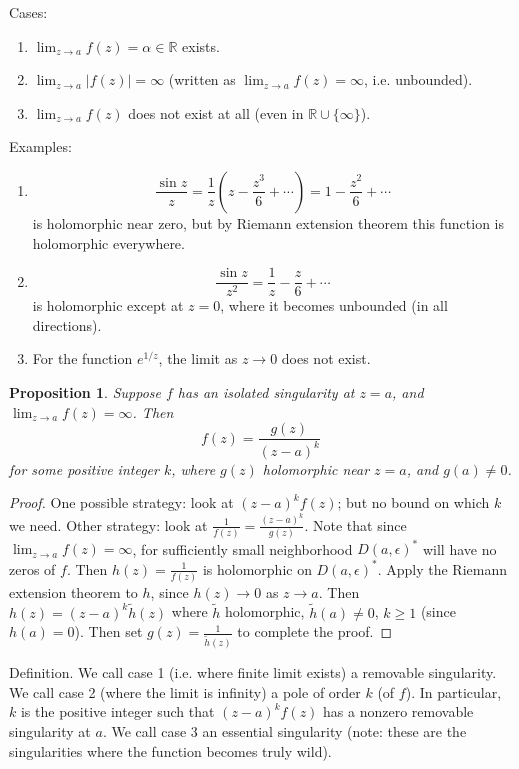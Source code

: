 \documentclass{artikel3}
\newcommand{\pr}[1]{\left(#1\right)}
\newcommand{\abs}[1]{\left|#1\right|}
\newcommand{\alt}[1]{\tilde{#1}}
\newcommand{\complex}{\mathbb{R}}
\newtheorem{prop}{Proposition}
\numberwithin{equation}{enumi}
\begin{document}
Cases:
\begin{enumerate}
	\item
		$\lim_{z\to a}f(z)=\alpha\in\complex$ exists.
	\item
		$\lim_{z\to a}\abs{f(z)}=\infty$ (written as
		$\lim_{z\to a}f(z)=\infty$, i.e. unbounded).
	\item
		$\lim_{z\to a}f(z)$ does not exist at all (even
		in $\complex\cup\{\infty\}$).
\end{enumerate}

Examples:
\begin{enumerate}
	\item
		\[
			\frac{\sin z}{z}=\frac{1}{z}\pr{z-\frac{z^3}{6}+\cdots}=1-\frac{z^2}{6}+\cdots
		\] is holomorphic near zero, but by Riemann extension theorem this function
		is holomorphic everywhere.
	\item
		\[
			\frac{\sin z}{z^2}=\frac{1}{z}-\frac{z}{6}+\cdots
		\] is holomorphic except at $z=0$, where it becomes unbounded (in all directions).
	\item
		For the function $e^{1/z}$, the limit as $z\to 0$ does not exist.
\end{enumerate}

\begin{prop}
	Suppose $f$ has an isolated singularity at $z=a$, and $\lim_{z\to a}f(z)=\infty$.
	Then \[
		f(z)=\frac{g(z)}{(z-a)^k}
	\] for some positive integer $k$, where $g(z)$ holomorphic near $z=a$,
	and $g(a)\neq 0$.
\end{prop}
\begin{proof}
	One possible strategy: look at $(z-a)^kf(z)$; but no bound on which $k$ we need.
	Other strategy: look at $\frac{1}{f(z)}=\frac{(z-a)^k}{g(z)}$.  Note
	that since $\lim_{z\to a}f(z)=\infty$, for sufficiently small neighborhood
	$D(a,\epsilon)^*$ will have no zeros of $f$.  Then $h(z)=\frac{1}{f(z)}$
	is holomorphic on $D(a,\epsilon)^*$.  Apply the Riemann extension theorem
	to $h$, since $h(z)\to 0$ as $z\to a$.  Then $h(z)=(z-a)^k\alt{h}(z)$
	where $\alt{h}$ holomorphic, $\alt{h}(a)\neq 0$, $k\geq 1$
	(since $h(a)=0$).  Then set $g(z)=\frac{1}{\alt{h}(z)}$ to complete
	the proof.
\end{proof}

Definition.  We call case 1 (i.e. where finite limit exists) a removable
singularity.  We call case 2 (where the limit is infinity) a pole of
order $k$ (of $f$).  In particular, $k$ is the positive integer
such that $(z-a)^kf(z)$ has a nonzero removable singularity at $a$.
We call case 3 an essential singularity (note: these are the singularities
where the function becomes truly wild).
\end{document}
